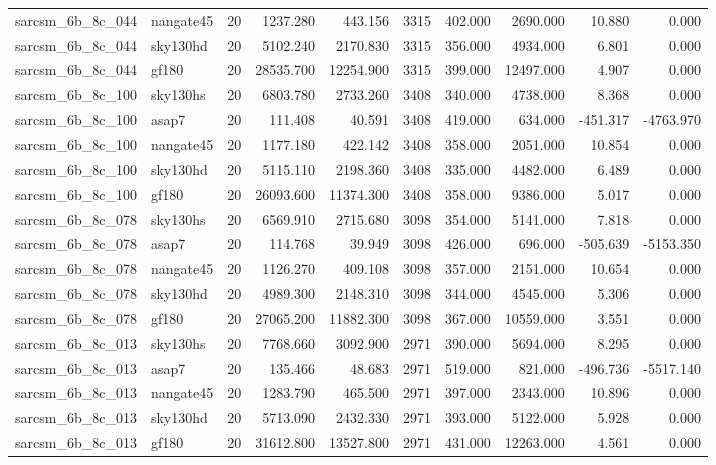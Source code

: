 \begin{tabular}{llrrrrrrrr}
sarcsm\_6b\_8c\_044 & nangate45 & 20 & 1237.280 & 443.156 & 3315 & 402.000 & 2690.000 & 10.880 & 0.000 \\
sarcsm\_6b\_8c\_044 & sky130hd & 20 & 5102.240 & 2170.830 & 3315 & 356.000 & 4934.000 & 6.801 & 0.000 \\
sarcsm\_6b\_8c\_044 & gf180 & 20 & 28535.700 & 12254.900 & 3315 & 399.000 & 12497.000 & 4.907 & 0.000 \\
sarcsm\_6b\_8c\_100 & sky130hs & 20 & 6803.780 & 2733.260 & 3408 & 340.000 & 4738.000 & 8.368 & 0.000 \\
sarcsm\_6b\_8c\_100 & asap7 & 20 & 111.408 & 40.591 & 3408 & 419.000 & 634.000 & -451.317 & -4763.970 \\
sarcsm\_6b\_8c\_100 & nangate45 & 20 & 1177.180 & 422.142 & 3408 & 358.000 & 2051.000 & 10.854 & 0.000 \\
sarcsm\_6b\_8c\_100 & sky130hd & 20 & 5115.110 & 2198.360 & 3408 & 335.000 & 4482.000 & 6.489 & 0.000 \\
sarcsm\_6b\_8c\_100 & gf180 & 20 & 26093.600 & 11374.300 & 3408 & 358.000 & 9386.000 & 5.017 & 0.000 \\
sarcsm\_6b\_8c\_078 & sky130hs & 20 & 6569.910 & 2715.680 & 3098 & 354.000 & 5141.000 & 7.818 & 0.000 \\
sarcsm\_6b\_8c\_078 & asap7 & 20 & 114.768 & 39.949 & 3098 & 426.000 & 696.000 & -505.639 & -5153.350 \\
sarcsm\_6b\_8c\_078 & nangate45 & 20 & 1126.270 & 409.108 & 3098 & 357.000 & 2151.000 & 10.654 & 0.000 \\
sarcsm\_6b\_8c\_078 & sky130hd & 20 & 4989.300 & 2148.310 & 3098 & 344.000 & 4545.000 & 5.306 & 0.000 \\
sarcsm\_6b\_8c\_078 & gf180 & 20 & 27065.200 & 11882.300 & 3098 & 367.000 & 10559.000 & 3.551 & 0.000 \\
sarcsm\_6b\_8c\_013 & sky130hs & 20 & 7768.660 & 3092.900 & 2971 & 390.000 & 5694.000 & 8.295 & 0.000 \\
sarcsm\_6b\_8c\_013 & asap7 & 20 & 135.466 & 48.683 & 2971 & 519.000 & 821.000 & -496.736 & -5517.140 \\
sarcsm\_6b\_8c\_013 & nangate45 & 20 & 1283.790 & 465.500 & 2971 & 397.000 & 2343.000 & 10.896 & 0.000 \\
sarcsm\_6b\_8c\_013 & sky130hd & 20 & 5713.090 & 2432.330 & 2971 & 393.000 & 5122.000 & 5.928 & 0.000 \\
sarcsm\_6b\_8c\_013 & gf180 & 20 & 31612.800 & 13527.800 & 2971 & 431.000 & 12263.000 & 4.561 & 0.000 \\

\end{tabular}

